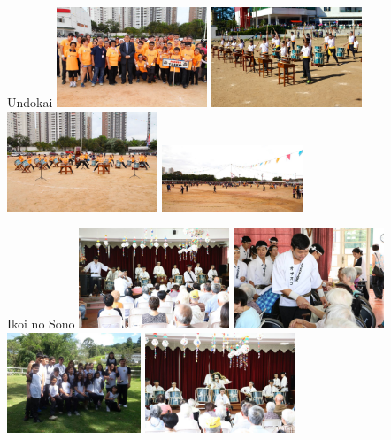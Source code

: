 \documentclass{beamer}
\begin{document}
\begin{frame}{Undokai}
    \includegraphics[height=3cm]{undokai-1}
    \includegraphics[height=3cm]{undokai-2}
    \includegraphics[height=3cm]{undokai-3}
    \includegraphics[height=2cm]{undokai-4}
\end{frame}

\begin{frame}{Ikoi no Sono}
    \includegraphics[height=3cm]{ikoi-no-sono-1}
    \includegraphics[height=3cm]{ikoi-no-sono-2}
    \includegraphics[height=3cm]{ikoi-no-sono-3}
    \includegraphics[height=3cm]{ikoi-no-sono-4}
\end{frame}
\end{document}
